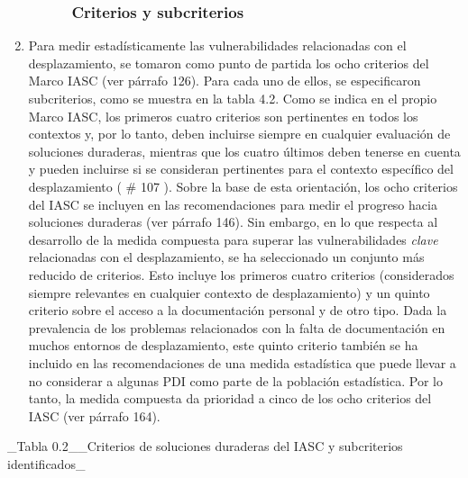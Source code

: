 \documentclass[
]{book}
\begin{document}
\begin{enumerate}
\begin{enumerate}
\begin{enumerate}
{      \subsubsection{Criterios y subcriterios}\label{criterios-y-subcriterios}}
    \end{enumerate}
  \end{enumerate}
\item
  Para medir estadísticamente las vulnerabilidades relacionadas con el desplazamiento, se tomaron como punto de partida los ocho criterios del Marco IASC (ver párrafo 126). Para cada uno de ellos, se especificaron subcriterios, como se muestra en la tabla 4.2. Como se indica en el propio Marco IASC, los primeros cuatro criterios son pertinentes en todos los contextos y, por lo tanto, deben incluirse siempre en cualquier evaluación de soluciones duraderas, mientras que los cuatro últimos deben tenerse en cuenta y pueden incluirse si se consideran pertinentes para el contexto específico del desplazamiento (
  \# 107
  ). Sobre la base de esta orientación, los ocho criterios del IASC se incluyen en las recomendaciones para medir el progreso hacia soluciones duraderas (ver párrafo 146). Sin embargo, en lo que respecta al desarrollo de la medida compuesta para superar las vulnerabilidades \emph{clave} relacionadas con el desplazamiento, se ha seleccionado un conjunto más reducido de criterios. Esto incluye los primeros cuatro criterios (considerados siempre relevantes en cualquier contexto de desplazamiento) y un quinto criterio sobre el acceso a la documentación personal y de otro tipo. Dada la prevalencia de los problemas relacionados con la falta de documentación en muchos entornos de desplazamiento, este quinto criterio también se ha incluido en las recomendaciones de una medida estadística que puede llevar a no considerar a algunas PDI como parte de la población estadística. Por lo tanto, la medida compuesta da prioridad a cinco de los ocho criterios del IASC (ver párrafo 164).
\end{enumerate}

\_Tabla 0.2\_\_Criterios de soluciones duraderas del IASC y subcriterios identificados\_
\end{document}
